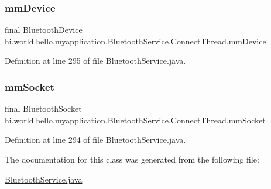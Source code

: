 \subsubsection{\texorpdfstring{mmDevice}{mmDevice}}
{\footnotesize\ttfamily final Bluetooth\+Device hi.\+world.\+hello.\+myapplication.\+Bluetooth\+Service.\+Connect\+Thread.\+mm\+Device\hspace{0.3cm}{\ttfamily [private]}}



Definition at line 295 of file Bluetooth\+Service.\+java.

\mbox{\label{classhi_1_1world_1_1hello_1_1myapplication_1_1_bluetooth_service_1_1_connect_thread_a7f0361ed7d37696342b8c6f28caf325a}} 
\subsubsection{\texorpdfstring{mmSocket}{mmSocket}}
{\footnotesize\ttfamily final Bluetooth\+Socket hi.\+world.\+hello.\+myapplication.\+Bluetooth\+Service.\+Connect\+Thread.\+mm\+Socket\hspace{0.3cm}{\ttfamily [private]}}



Definition at line 294 of file Bluetooth\+Service.\+java.



The documentation for this class was generated from the following file\+:\begin{DoxyCompactItemize}
\item 
\mbox{\hyperlink{_bluetooth_service_8java}{Bluetooth\+Service.\+java}}\end{DoxyCompactItemize}

